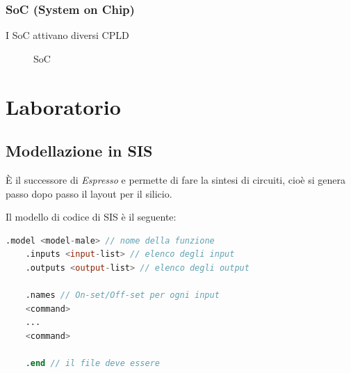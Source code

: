 \documentclass[a4paper]{article}
\theoremstyle{break}
\theoremstyle{break}
\theoremstyle{break}
\theoremstyle{break}
\begin{document}
\subsubsection{SoC (System on Chip)}
I SoC attivano diversi CPLD
\begin{figure}[H]
   \begin{center}
   \end{center} 
   \caption{SoC}
\end{figure}

\section{Laboratorio}
\subsection{Modellazione in SIS}
È il successore di \emph{Espresso} e permette di fare la sintesi di circuiti, cioè
si genera passo dopo passo il layout per il silicio.

Il modello di codice di SIS è il seguente:
\begin{lstlisting}[language=Verilog]
    .model <model-male> // nome della funzione
    .inputs <input-list> // elenco degli input
    .outputs <output-list> // elenco degli output

    .names // On-set/Off-set per ogni input
    <command> 
    ...
    <command>

    .end // il file deve essere 
\end{lstlisting}
\end{document}
